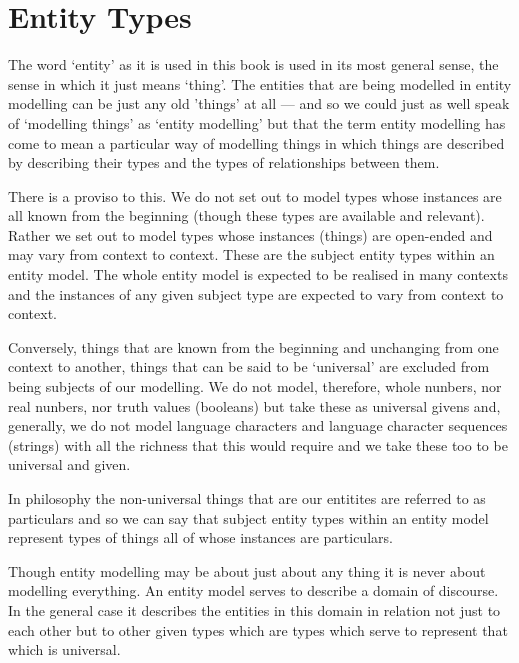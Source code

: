 
\section{Entity Types}

\mynote The word `entity' as it is used in this book is used in its most general sense,  the sense in which it just means `thing'. The entities that are being modelled in entity modelling can be just any old 'things' at all --- and so we could just as well speak of `modelling things' as `entity modelling' but that the term entity modelling
has come to mean a particular way of modelling things in which things are described by describing their types and the types of relationships between them.

\mynote There is a proviso to this. We do not set out to model types whose instances are all known from the beginning (though these types are available and relevant). Rather we set out to model types whose instances (things) are open-ended and may vary from context to context. These are the subject entity types within an entity model. The whole entity model is expected to be realised in many contexts and the instances of any given subject type are expected to vary from context to context.
 
\mynote
Conversely, things that are known from the beginning and unchanging from one context to another, things that can be said to be `universal' are excluded from being subjects of our modelling. We do not model, therefore, whole nunbers, nor real nunbers, nor truth values (booleans) but take these as universal givens and, generally, we do not model language characters and language character sequences (strings) with all the richness that this would require and we take these too to be universal and given. 

\mynote
In philosophy the non-universal things that are our entitites are referred to as particulars and so we can say that subject entity types within an entity model represent types of things all of whose instances are particulars. 

\mynote Though entity modelling may be about just about any thing it is never about modelling everything.
An entity model serves to describe a domain of discourse. In the general case it describes the entities in this domain in relation not just to each other but to other given types which are types which serve to represent that which is universal. 


